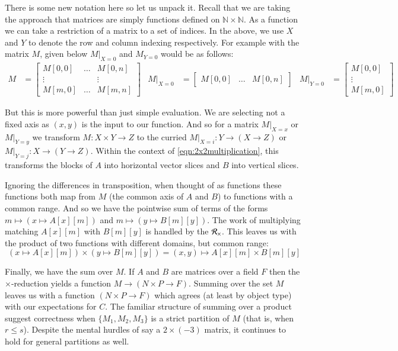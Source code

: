 There is some new notation here so let us unpack it.
Recall that we are taking the approach that matrices are simply functions defined on $\mathbb{N} \times \mathbb{N}$.
As a function we can take a restriction of a matrix to a set of indices.
In the above, we use $X$ and $Y$ to denote the row and column indexing respectively.
For example with the matrix $M$, given below $M|_{X=0}$ and $M_{Y=0}$ would be as follows:
\begin{align*}
	M &= \begin{bmatrix}
		M[0,0] 	& \ldots 	& M[0,n] \\
		\vdots 	& 		& \vdots \\
		M[m,0]	& \ldots & M[m,n]
	\end{bmatrix} &
	M|_{X=0} &= \begin{bmatrix}
		M[0,0] & \ldots & M[0,n]
	\end{bmatrix} &
	M|_{Y=0} &= \begin{bmatrix}
		M[0,0] \\ \vdots \\ M[m,0]
	\end{bmatrix}
\end{align*}


But this is more powerful than just simple evaluation.
We are selecting not a fixed axis as $(x,y)$ is the input to our function.
And so for a matrix $M|_{X=x}$ or $M|_{Y=y}$ we transform $M:X\times Y \to Z$
to the curried $M|_{X=i}:Y \to ( X \to Z)$ or $M|_{Y=j}:X \to (Y \to Z)$.
Within the context of \ref{eqn:2x2multiplication}, this transforms the blocks of $A$ into horizontal vector slices 
and $B$ into vertical slices.


Ignoring the differences in transposition, when thought of as functions these functions both map from $M$ 
(the common axis of $A$ and $B$) to functions with a common range.
And so we have the pointwise sum of terms of the forms $m \mapsto ( x \mapsto A[x][m] )$ and 
$m \mapsto (y \mapsto B[m][y])$.
The work of multiplying matching $A[x][m]$ with $B[m][y]$ is handled by the $\R[\times]$.
This leaves us with the product of two functions with different domains, but common range:
\begin{equation*}
	 ( x \mapsto A[x][m] )\times (y \mapsto B[m][y]) 
	 = (x,y) \mapsto A[x][m] \times B[m][y]
\end{equation*}


Finally, we have the sum over $M$.
If $A$ and $B$ are matrices over a field $F$ then the \mbox{$\times$-reduction} 
yields a function $M \to (N \times P \to F)$.
Summing over the set $M$ leaves us with a function $(N \times P \to F)$ which agrees (at least by object type) 
with our expectations for $C$.
The familiar structure of summing over a product suggest correctness when $\big\{ M_1, M_2, M_3 \big\}$ 
is a strict partition of $M$ (that is, when $r \leq s$).
Despite the mental hurdles of say a $2 \times (-3)$ matrix, it continues to hold for general partitions as well.





